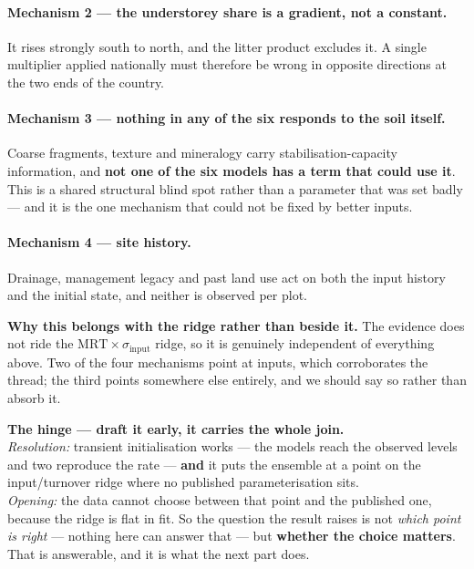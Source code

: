\documentclass[11pt]{article}
\newcommand{\sinput}{\sigma_{\mathrm{input}}}
\begin{document}
\paragraph{Mechanism 2 --- the understorey share is a gradient, not a constant.} It rises strongly
south to north, and the litter product excludes it. A single multiplier applied nationally must
therefore be wrong in opposite directions at the two ends of the country.

\paragraph{Mechanism 3 --- nothing in any of the six responds to the soil itself.} Coarse fragments,
texture and mineralogy carry stabilisation-capacity information, and \textbf{not one of the six
models has a term that could use it}. This is a shared structural blind spot rather than a
parameter that was set badly --- and it is the one mechanism that could not be fixed by better
inputs.

\paragraph{Mechanism 4 --- site history.} Drainage, management legacy and past land use act on both
the input history and the initial state, and neither is observed per plot.

\begin{note}
\textbf{Why this belongs with the ridge rather than beside it.} The evidence does not ride the
$\mathrm{MRT}\times\sinput$ ridge, so it is genuinely independent of everything above. Two of the
four mechanisms point at inputs, which corroborates the thread; the third points somewhere else
entirely, and we should say so rather than absorb it.
\end{note}

\begin{note}
\textbf{The hinge --- draft it early, it carries the whole join.}\\[3pt]
\emph{Resolution:} transient initialisation works --- the models reach the observed levels and two
reproduce the rate --- \textbf{and} it puts the ensemble at a point on the input/turnover ridge
where no published parameterisation sits.\\[3pt]
\emph{Opening:} the data cannot choose between that point and the published one, because the ridge
is flat in fit. So the question the result raises is not \emph{which point is right} --- nothing here
can answer that --- but \textbf{whether the choice matters}. That is answerable, and it is what the
next part does.
\end{note}
\end{document}
